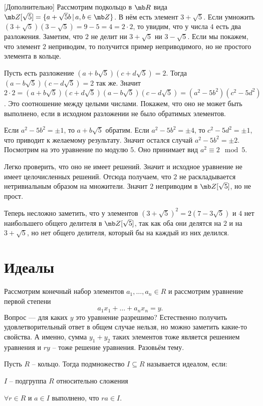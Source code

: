 \rm[Дополнительно] Рассмотрим подкольцо в $\mb R$ вида  $\mb Z[\sqrt{5}]=\{a+\sqrt{5}b\,|\, a,b\in \mb Z\}$. В нём есть элемент $3+\sqrt{5}$. Если умножить $(3+\sqrt{5})(3-\sqrt{5})=9-5=4 =2\cdot 2$, то увидим, что у числа $4$ есть два разложения. Заметим, что $2$ не делит ни $3+\sqrt{5}$ ни $3-\sqrt{5}$. Если мы покажем, что элемент $2$ неприводим, то получится пример неприводимого, но не простого элемента в кольце.

Пусть есть разложение $(a+b\sqrt{5})(c+d\sqrt{5})=2$. Тогда $(a-b\sqrt{5})(c-d\sqrt{5})=2$ так же. Значит
$2\cdot 2= (a+b\sqrt{5})(c+d\sqrt{5})(a-b\sqrt{5})(c-d\sqrt{5})=(a^2-5b^2)(c^2-5d^2)$. Это соотношение между целыми числами. Покажем, что оно не может быть выполнено, если в исходном разложении не было обратимых элементов.

Если $a^2-5b^2=\pm 1$, то $a+b\sqrt{5}$ обратим. Если $a^2-5b^2=\pm 4$, то $c^2-5d^2=\pm 1$, что приводит к желаемому результату. Значит остался случай $a^2-5b^2=\pm 2$. Посмотрим на это уравнение по модулю $5$. Оно принимает вид $a^2\equiv 2 \mod 5$. 

Легко проверить, что оно не имеет решений. Значит и исходное уравнение не имеет целочисленных решений.  Отсюда получаем, что $2$ не раскладывается нетривиальным образом на множители. Значит $2$ неприводим в $\mb Z[\sqrt{5}]$, но не прост.

Теперь несложно заметить, что у элементов $(3+\sqrt{5})^2=2(7-3\sqrt{5})$ и $4$ нет наибольшего общего делителя в $\mb Z[\sqrt{5}]$, так как оба они делятся на $2$ и на $3+\sqrt{5}$, но нет общего делителя, который бы на каждый из них делился.
\erm






\section{Идеалы}

Рассмотрим конечный набор элементов $a_1, \dots, a_n \in R$ и рассмотрим уравнение первой степени
$$a_1 x_1 + \dots +a_n x_n =y.$$
Вопрос — для каких $y$ это уравнение разрешимо? Естественно получить удовлетворительный ответ в общем случае нельзя, но можно заметить какие-то свойства. А именно, сумма $y_1+y_2$ таких элементов тоже является решением уравнения и $ry$ -- тоже решение уравнения. Разовьём тему.

\dfn[Идеал] Пусть $R$ -- кольцо. Тогда подмножество $I\subseteq R$ называется идеалом, если:
\enm
\item $I$ -- подгруппа $R$ относительно сложения
\item $\forall r \in R$ и $a\in I$ выполнено, что $ra \in I$.
\eenm
\edfn

